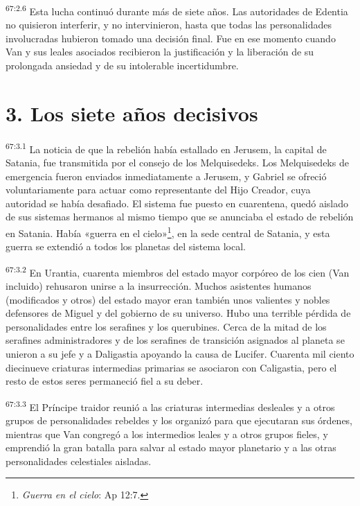 \par
\textsuperscript{67:2.6} Esta lucha continuó durante más de siete años. Las autoridades de Edentia no quisieron interferir, y no intervinieron, hasta que todas las personalidades involucradas hubieron tomado una decisión final. Fue en ese momento cuando Van y sus leales asociados recibieron la justificación y la liberación de su prolongada ansiedad y de su intolerable incertidumbre.

\section*{3. Los siete años decisivos}
\par
\textsuperscript{67:3.1} La noticia de que la rebelión había estallado en Jerusem, la capital de Satania, fue transmitida por el consejo de los Melquisedeks. Los Melquisedeks de emergencia fueron enviados inmediatamente a Jerusem, y Gabriel se ofreció voluntariamente para actuar como representante del Hijo Creador, cuya autoridad se había desafiado. El sistema fue puesto en cuarentena, quedó aislado de sus sistemas hermanos al mismo tiempo que se anunciaba el estado de rebelión en Satania. Había «guerra en el cielo»\footnote{\textit{Guerra en el cielo}: Ap 12:7.}, en la sede central de Satania, y esta guerra se extendió a todos los planetas del sistema local.

\par
\textsuperscript{67:3.2} En Urantia, cuarenta miembros del estado mayor corpóreo de los cien (Van incluido) rehusaron unirse a la insurrección. Muchos asistentes humanos (modificados y otros) del estado mayor eran también unos valientes y nobles defensores de Miguel y del gobierno de su universo. Hubo una terrible pérdida de personalidades entre los serafines y los querubines. Cerca de la mitad de los serafines administradores y de los serafines de transición asignados al planeta se unieron a su jefe y a Daligastia apoyando la causa de Lucifer. Cuarenta mil ciento diecinueve criaturas intermedias primarias se asociaron con Caligastia, pero el resto de estos seres permaneció fiel a su deber.

\par
\textsuperscript{67:3.3} El Príncipe traidor reunió a las criaturas intermedias desleales y a otros grupos de personalidades rebeldes y los organizó para que ejecutaran sus órdenes, mientras que Van congregó a los intermedios leales y a otros grupos fieles, y emprendió la gran batalla para salvar al estado mayor planetario y a las otras personalidades celestiales aisladas.

